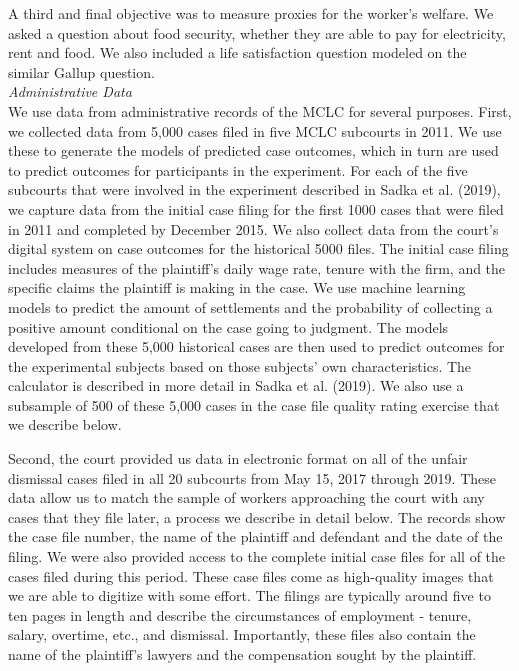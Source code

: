 \documentclass[12 pt]{article}
\begin{document}
A third and final objective was to measure proxies for the worker’s welfare. We asked a question about food security, whether they are able to pay for electricity, rent and food. We also included a life satisfaction question modeled on the similar Gallup question.
\[\]
\noindent\emph{Administrative Data}\\
We use data from administrative records of the MCLC for several purposes. First, we collected data from 5,000 cases filed in five MCLC subcourts in 2011. We use these to generate the models of predicted case outcomes, which in turn are used to predict outcomes for participants in the experiment. For each of the five subcourts that were involved in the experiment described in Sadka et al. (2019), we capture data from the initial case filing for the first 1000 cases that were filed in 2011 and completed by December 2015. We also collect data from the court’s digital system on case outcomes for the historical 5000 files. The initial case filing includes measures of the plaintiff’s daily wage rate, tenure with the firm, and the specific claims the plaintiff is making in the case. We use machine learning models to predict the amount of settlements and the probability of collecting a positive amount conditional on the case going to judgment. The models developed from these 5,000 historical cases are then used to predict outcomes for the experimental subjects based on those subjects’ own characteristics. The calculator is described in more detail in Sadka et al. (2019). We also use a subsample of 500 of these 5,000 cases in the case file quality rating exercise that we describe below. 

Second, the court provided us data in electronic format on all of the unfair dismissal cases filed in all 20 subcourts from May 15, 2017 through 2019. These data allow us to match the sample of workers approaching the court with any cases that they file later, a process we describe in detail below. The records show the case file number, the name of the plaintiff and defendant and the date of the filing. We were also provided access to the complete initial case files for all of the cases filed during this period. These case files come as high-quality images that we are able to digitize with some effort. The filings are typically around five to ten pages in length and describe the circumstances of employment - tenure, salary, overtime, etc., and dismissal. Importantly, these files also contain the name of the plaintiff’s lawyers and the compensation sought by the plaintiff.
\end{document}
